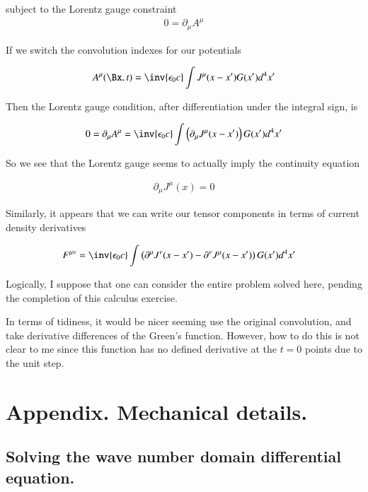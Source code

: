subject to the Lorentz gauge constraint
\begin{align*}
0 = \partial_\mu A^\mu
\end{align*}

If we switch the convolution indexes for our potentials

\begin{align*}
{A^\mu}(\Bx, t) &= \inv{\epsilon_0 c} \int J^\mu(x - x') G(x') d^4 x' \\
\end{align*}

Then the Lorentz gauge condition, after differentiation under the integral sign, is

\begin{align*}
0 = \partial_\mu A^\mu &= \inv{\epsilon_0 c} \int \left(\partial_\mu J^\mu(x - x') \right) G(x') d^4 x' \\
\end{align*}

So we see that the Lorentz gauge seems to actually imply the continuity equation

\begin{align*}
\partial_\mu J^\mu(x) = 0
\end{align*}

Similarly, it appears that we can write our tensor components in terms of current density derivatives

\begin{align}
F^{\mu\nu} 
&= \inv{\epsilon_0 c} \int \left(\partial^\mu J^\nu(x - x') - \partial^\nu J^\mu(x - x') \right) G(x') d^4 x'
\end{align}

Logically, I suppose that one can consider the entire problem solved here, pending the completion of this calculus exercise.

In terms of tidiness, it would be nicer seeming use the original convolution, and take derivative differences of the Green's
function.  However, how to do this is not clear to me since this function has no defined derivative
at the $t=0$ points due to the unit step.

\section{Appendix.  Mechanical details. }

\subsection{Solving the wave number domain differential equation. }


